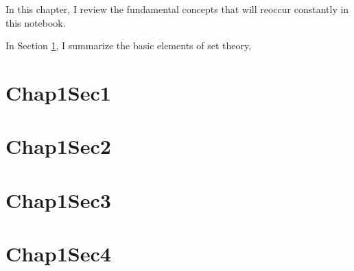 \minitoc

\vspace{0.5cm}
In this chapter, I review the fundamental concepts that will reoccur constantly in this notebook.

In Section \ref{chap1:set_theory}, I summarize the basic elements of set theory, 

\section{Chap1Sec1}\label{chap1:set_theory}


\section{Chap1Sec2}\label{chap1:sec2}


\section{Chap1Sec3}\label{chap1:sec3}

\section{Chap1Sec4}\label{chap1:sec4}

